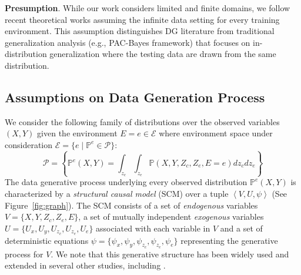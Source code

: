 \textbf{Presumption}. While our work considers limited 
and finite domains, we follow recent theoretical works \citep{wang2022provable, rosenfeld2020risks, kamath2021does, ahuja2021invariance, chen2022iterative} assuming the infinite data setting for every training environment. This assumption distinguishes DG literature from traditional generalization analysis (e.g., PAC-Bayes framework) that focuses on in-distribution generalization where the testing data are drawn from the same distribution.


\subsection{Assumptions on Data Generation Process}
We consider the following family of distributions over the observed variables $(X,Y)$ given the environment $E=e \in \mathcal{E}$ where environment space under consideration $\mathcal{E} = \{ e \mid \mathbb{P}^e \in \mathcal{P} \}$:
\vspace{-2mm}
\begin{equation*}
    \mathcal{P}=\left \{\mathbb{P}^e(X, Y)=\int_{z_c}\int_{z_e}\mathbb{P}(X, Y, Z_c,Z_e, E=e)d z_c d z_e\right \}
\end{equation*}
The data generative process underlying every observed distribution $\mathbb{P}^e(X, Y)$ is characterized by a \textit{structural causal model} (SCM) over a tuple  $\left \langle V, U, \psi \right \rangle$ (See Figure~\ref{fig:graph}). The SCM consists of a set of \textit{endogenous} variables $V = \{X, Y, Z_c, Z_e, E\}$, a set of mutually independent \textit{exogenous} variables $U = \{U_x, U_y, U_{z_c}, U_{z_e}, U_e\}$ associated with each variable in $V$ and a set of deterministic equations $\psi = \{\psi_x, \psi_y, \psi_{z_c}, \psi_{z_e}, \psi_e\}$ representing the generative process for $V$. We note that this generative structure has been widely used and extended in several other studies, including \citep{chang2020invariant, mahajan2021domain, li2022invariant, zhang2023causal, lu2021invariant,liu2021heterogeneous}. 


